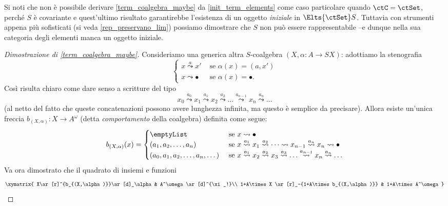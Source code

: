 \begin{remark}
	Si noti che non è possibile derivare \ref{term_coalgebra_maybe} da \ref{init_term_elements} come caso particolare quando \(\ctC=\ctSet\), perché \(S\) è covariante e quest'ultimo risultato garantirebbe l'esistenza di un oggetto \emph{iniziale} in \(\Elts{\ctSet}S\). Tuttavia con strumenti appena più sofisticati (si veda \ref{rep_preservano_lim}) possiamo dimostrare che \(S\) non può essere rappresentabile --e dunque nella sua categoria degli elementi manca un oggetto iniziale.
\end{remark}
\begin{proof}[Dimostrazione di \ref{term_coalgebra_maybe}]
	Consideriamo una generica altra \(S\)-coalgebra \((X, \alpha \colon A \to SX)\): adottiamo la stenografia
	\[\begin{cases}
			x \overset a\leadsto x' & \text{ se } \alpha(x) = (a,x')   \\
			x  \leadsto \bullet     & \text{ se } \alpha(x) = \bullet.
		\end{cases}\]
	Così risulta chiaro come dare senso a scritture del tipo
	\begin{equation}\label{iter_coalgebra}
		x_0 \overset{a_0}\leadsto
		x_1 \overset{a_1}\leadsto
		x_2 \overset{a_2}\leadsto
		\dots\overset{a_{n-1}}\leadsto
		x_n \overset{a_n}\leadsto \dots
	\end{equation}
	(al netto del fatto che queste concatenazioni possono avere lunghezza infinita, ma questo è semplice da precisare). Allora esiste un'unica freccia \(b_{(X,\alpha)} \colon X \to A^\omega\) (detta \emph{comportamento} della coalgebra) definita come segue:
	\[
		b_{(X,\alpha)}(x) =
		\begin{cases}
			\emptyList                     & \text{ se } x\leadsto\bullet                                                                                                  \\
			(a_1,a_2,\dots, a_n)           & \text{ se } x \overset{a_1}\leadsto x_1 \overset{a_2}\leadsto\dots \leadsto x_{n-1} \overset{a_n}\leadsto x_n\leadsto \bullet \\
			(a_0,a_1,a_2,\dots, a_n,\dots) & \text{ se } x \overset{a_1}\leadsto x_2 \overset{a_2}\leadsto x_3 \overset{a_3}\leadsto
			\dots
			\overset{a_{n-1}}\leadsto x_n \overset{a_n}\leadsto \dots
		\end{cases}\]
	Va ora dimostrato che il quadrato di insiemi e funzioni
	\[\xymatrix{
		X\ar[r]^{b_{(X,\alpha)}}\ar[d]_\alpha & A^\omega \ar[d]^{\xi_!}\\
		1+A\times X \ar[r]_-{1+A\times b_{(X,\alpha)}} & 1+A\times A^\omega
}\]
\end{proof}

